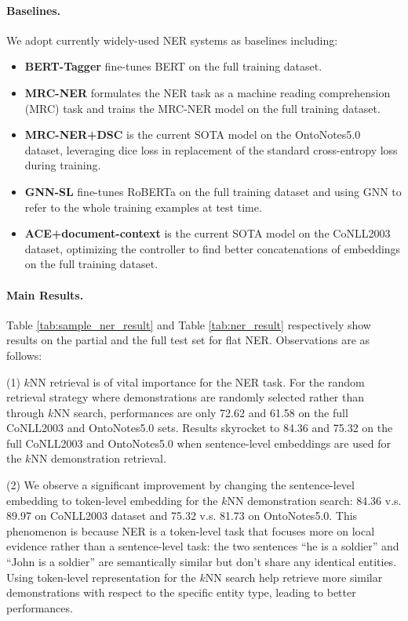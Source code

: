\documentclass[11pt]{article}
\begin{document}
\paragraph{Baselines.} We adopt currently widely-used NER systems as baselines including:
\begin{itemize}
  \item \textbf{BERT-Tagger} \cite{devlin2018bert} fine-tunes BERT on the full training dataset.
  \item \textbf{MRC-NER} \cite{li2019unified} formulates the NER task as a machine reading comprehension (MRC) task and trains the MRC-NER model on the full training dataset.
  \item \textbf{MRC-NER+DSC} \cite{li2019dice} is the current SOTA model on the OntoNotes5.0 dataset, leveraging dice loss in replacement of the standard cross-entropy loss during training.
  \item \textbf{GNN-SL} \cite{wang2022gnn} fine-tunes RoBERTa \cite{liu2019roberta} on the full training dataset and using GNN to refer to the whole training examples at test time.
  \item \textbf{ACE+document-context} \cite{wang2020automated} is the current SOTA model on the CoNLL2003 dataset, optimizing the controller to find better concatenations of embeddings on the full training dataset.
\end{itemize}


\paragraph{Main Results.}
\label{flat_ner_results}
Table \ref{tab:sample_ner_result} and Table \ref{tab:ner_result} 
respectively show results on the partial and the full test set for flat NER. Observations are as follows:

(1) $k$NN retrieval is of vital importance for the NER task.
For the random retrieval strategy where demonstrations are randomly selected rather than through $k$NN search,  performances are only 72.62 and 61.58 on the full CoNLL2003 and 
OntoNotes5.0 sets. Results skyrocket to 84.36 and 75.32 on the full CoNLL2003 and 
OntoNotes5.0 when sentence-level embeddings are used for the $k$NN demonstration retrieval. 

(2) We observe a significant improvement by changing the sentence-level embedding to token-level embedding for the $k$NN demonstration search: 84.36 v.s. 89.97 on  CoNLL2003 dataset and 75.32 v.s. 81.73 on OntoNotes5.0. This phenomenon is because NER is a token-level task that focuses more on local evidence rather than a sentence-level task: the two sentences “he is a soldier” and “John is a soldier” are semantically similar but don't share any identical entities.
Using token-level representation for the $k$NN search help retrieve more similar demonstrations with respect to the specific entity type, leading to better performances. 
\end{document}
